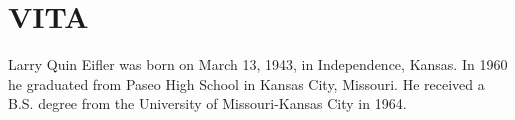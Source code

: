 %    


\chapter*{VITA}

     Larry Quin Eifler was born on March 13, 1943, 
in Independence, Kansas.  In 1960 he graduated 
from Paseo High School in Kansas City, Missouri.
He received a B.S. degree from the 
University of Missouri-Kansas City in 1964.

\clearpage
\endinput
